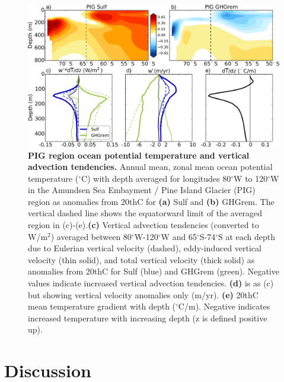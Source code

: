 \documentclass{nature}
\begin{document}
\begin{figure}%
 \noindent\includegraphics[width=35pc]{figures/TEMPanomvertheat_justPIG.pdf}
\caption{\textbf{PIG region ocean potential temperature and vertical advection tendencies.} Annual mean, zonal mean ocean potential temperature ($^\circ$C) with depth averaged for longitudes 80$^\circ$W to 120$^\circ$W in the Amundsen Sea Embayment / Pine Island Glacier (PIG) region as anomalies from 20thC for \textbf{(a)} Sulf and \textbf{(b)} GHGrem. The vertical dashed line shows the equatorward limit of the averaged region in (c)-(e).\textbf{(c)} Vertical advection tendencies (converted to W/m$^2$) averaged between 80$^\circ$W-120$^\circ$W and 65$^\circ$S-74$^\circ$S at each depth due to Eulerian vertical velocity (dashed), eddy-induced vertical velocity (thin solid), and total vertical velocity (thick solid) as anomalies from 20thC for Sulf (blue) and GHGrem (green). Negative values indicate increased vertical advection tendencies. \textbf{(d)} is as (c) but showing vertical velocity anomalies only (m/yr). \textbf{(e)} 20thC mean temperature gradient with depth ($^\circ$C/m). Negative indicates increased temperature with increasing depth (z is defined positive up).}
\label{fig:pigtemp}
\end{figure}

\section{Discussion}
\end{document}
